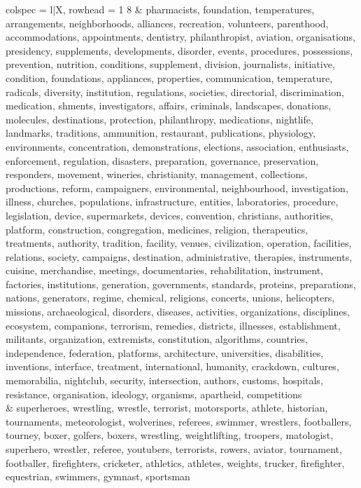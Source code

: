 \begin{tblr}[
  long,
  caption = {Examples from SNLI.},
  entry = {Short Caption},
  label = {tblr:test},
]{
colspec = {l|X},
rowhead = 1}
8 & pharmacists, foundation, temperatures, arrangements, neighborhoods, alliances, recreation, volunteers, parenthood, accommodations, appointments, dentistry, philanthropist, aviation, organisations, presidency, supplements, developments, disorder, events, procedures, possessions, prevention, nutrition, conditions, supplement, division, journalists, initiative, condition, foundations, appliances, properties, communication, temperature, radicals, diversity, institution, regulations, societies, directorial, discrimination, medication, shments, investigators, affairs, criminals, landscapes, donations, molecules, destinations, protection, philanthropy, medications, nightlife, landmarks, traditions, ammunition, restaurant, publications, physiology, environments, concentration, demonstrations, elections, association, enthusiasts, enforcement, regulation, disasters, preparation, governance, preservation, responders, movement, wineries, christianity, management, collections, productions, reform, campaigners, environmental, neighbourhood, investigation, illness, churches, populations, infrastructure, entities, laboratories, procedure, legislation, device, supermarkets, devices, convention, christians, authorities, platform, construction, congregation, medicines, religion, therapeutics, treatments, authority, tradition, facility, venues, civilization, operation, facilities, relations, society, campaigns, destination, administrative, therapies, instruments, cuisine, merchandise, meetings, documentaries, rehabilitation, instrument, factories, institutions, generation, governments, standards, proteins, preparations, nations, generators, regime, chemical, religions, concerts, unions, helicopters, missions, archaeological, disorders, diseases, activities, organizations, disciplines, ecosystem, companions, terrorism, remedies, districts, illnesses, establishment, militants, organization, extremists, constitution, algorithms, countries, independence, federation, platforms, architecture, universities, disabilities, inventions, interface, treatment, international, humanity, crackdown, cultures, memorabilia, nightclub, security, intersection, authors, customs, hospitals, resistance, organisation, ideology, organisms, apartheid, competitions \\ & superheroes, wrestling, wrestle, terrorist, motorsports, athlete, historian, tournaments, meteorologist, wolverines, referees, swimmer, wrestlers, footballers, tourney, boxer, golfers, boxers, wrestling, weightlifting, troopers, matologist, superhero, wrestler, referee, youtubers, terrorists, rowers, aviator, tournament, footballer, firefighters, cricketer, athletics, athletes, weights, trucker, firefighter, equestrian, swimmers, gymnast, sportsman \\\midrule

\end{tblr}
